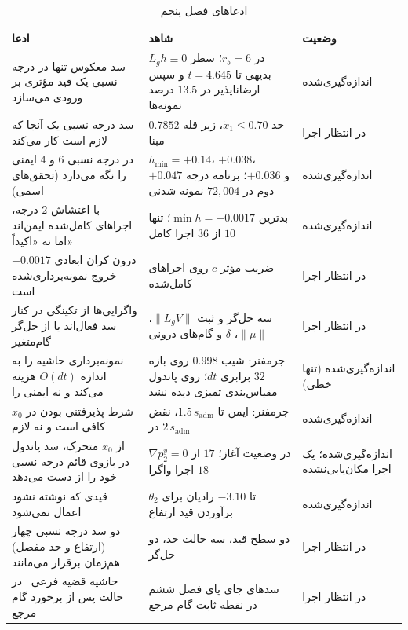 \documentclass[10pt,twocolumn]{article}
\newcommand{\en}[1]{\lr{#1}}
\newcommand{\nd}{\lr{\textendash}}
\begin{document}
\begin{table}[!t]
    \centering
    \caption{ادعاهای فصل پنجم}
    \label{tab:claims5}
    \small
    \begin{tabular}{p{}p{}p{}}
        \toprule
        ادعا & شاهد & وضعیت \\
        \midrule
        سد معکوس تنها در درجه نسبی یک قید مؤثری بر ورودی می‌سازد &
            $L_gh\equiv0$ در $r_b=6$؛ سطر بدیهی تا $t=4.645$ و سپس ارضاناپذیر در $13.5$ درصد نمونه‌ها &
            اندازه‌گیری‌شده \\
        سد درجه نسبی یک آنجا که لازم است کار می‌کند &
            حد $\dot x_1\le0.70$، زیر قله $0.7852$ مبنا &
            در انتظار اجرا \\
        \en{ECBF} در درجه نسبی $6$ و $4$ ایمنی را نگه می‌دارد (تحقق‌های اسمی) &
            $h_{\min}=+0.14$، $+0.038$، $+0.047$ و $+0.036$؛ برنامه درجه دوم در $72{,}004$ نمونه شدنی &
            اندازه‌گیری‌شده \\
        با اغتشاش $2$ درجه، اجراهای کامل‌شده ایمن‌اند اما نه «اکیداً» &
            بدترین $\min h=-0.0017$؛ تنها $10$ از $36$ اجرا کامل &
            اندازه‌گیری‌شده \\
        $-0.0017$ درون کران ابعادی خروج نمونه‌برداری‌شده است &
            ضریب مؤثر $c$ روی اجراهای کامل‌شده &
            در انتظار اجرا \\
        واگرایی‌ها از تکینگی \en{CLF} در کنار سد فعال‌اند یا از حل‌گر گام‌متغیر &
            سه حل‌گر و ثبت $\|L_gV\|$، $\|\mu\|$، $\delta$ و گام‌های درونی &
            در انتظار اجرا \\
        نمونه‌برداری حاشیه را به اندازه $O(dt)$ هزینه می‌کند و نه ایمنی را &
            جرم\nd{}فنر: شیب $0.998$ روی بازه $32$ برابری $dt$؛ روی پاندول مقیاس‌بندی تمیزی دیده نشد &
            اندازه‌گیری‌شده (تنها خطی) \\
        شرط پذیرفتنی بودن در $x_0$ کافی است و نه لازم &
            جرم\nd{}فنر: ایمن تا $1.5\,s_{\mathrm{adm}}$، نقض در $2\,s_{\mathrm{adm}}$ &
            اندازه‌گیری‌شده \\
        از $x_0$ متحرک، سد پاندول در بازوی قائم درجه نسبی خود را از دست می‌دهد &
            $\nabla p_2^y=0$ در وضعیت آغاز؛ $17$ از $18$ اجرا واگرا &
            اندازه‌گیری‌شده؛ یک اجرا مکان‌یابی‌نشده \\
        قیدی که نوشته نشود اعمال نمی‌شود &
            $\theta_2$ تا $-3.10$ رادیان برای برآوردن قید ارتفاع &
            اندازه‌گیری‌شده \\
        دو سد درجه نسبی چهار (ارتفاع و حد مفصل) هم‌زمان برقرار می‌مانند &
            دو سطح قید، سه حالت حد، دو حل‌گر &
            در انتظار اجرا \\
        حاشیه قضیه فرعی~\en{5.2} در حالت پس از برخورد گام مرجع &
            سدهای جای پای فصل ششم در نقطه ثابت گام مرجع &
            در انتظار اجرا \\
        \bottomrule
    \end{tabular}
\end{table}
\end{document}
